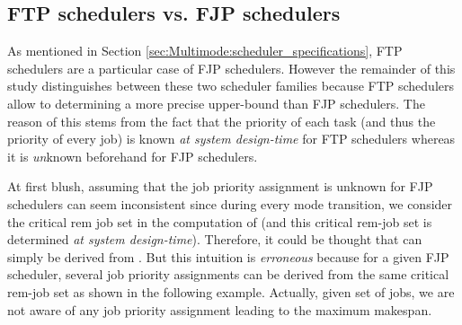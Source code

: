\documentclass{article}
\newtheorem{validity test}{Validity Test}
\begin{document}
\subsection{FTP schedulers vs. FJP schedulers}

As mentioned in Section \ref{sec:Multimode:scheduler_specifications}, FTP schedulers are a particular case of FJP schedulers. However the remainder of this study distinguishes between these two scheduler families because FTP schedulers allow to determining a more precise upper-bound  than FJP schedulers. The reason of this stems from the fact that the priority of each task (and thus the priority of every job) is known \emph{at system design-time} for FTP schedulers whereas it is \emph{un}known beforehand for FJP schedulers. 

At first blush, assuming that the job priority assignment  is unknown for FJP schedulers can seem inconsistent since during every mode transition, we consider the critical rem job set in the computation of  (and this critical rem-job set is determined \emph{at system design-time}). Therefore, it could be thought that  can simply be derived from . But this intuition is \emph{erroneous} because for a given FJP scheduler, several job priority assignments can be derived from the same critical rem-job set as shown in the following example. Actually, given set of jobs, we are not aware of any job priority assignment leading to the maximum makespan.
\end{document}
